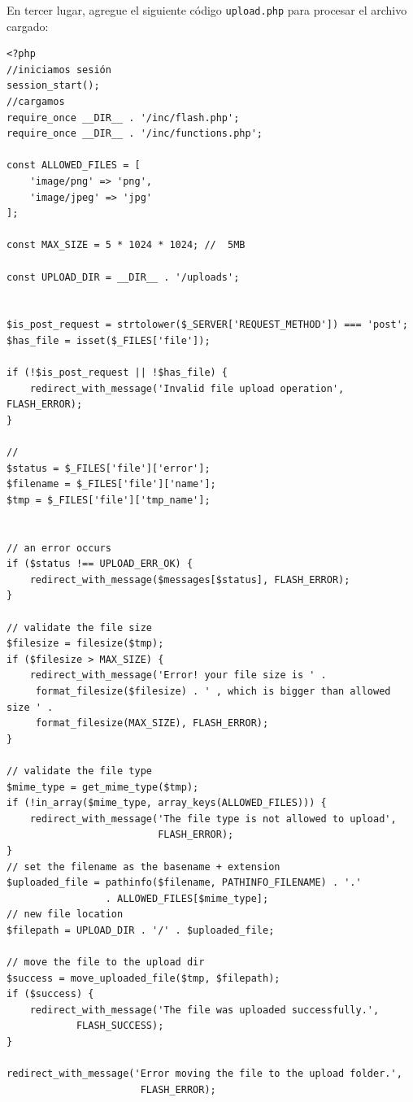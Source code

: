 \documentclass[11pt]{article}
\begin{document}
En tercer lugar, agregue el siguiente código \texttt{upload.php} para
procesar el archivo cargado:
\begin{verbatim}
<?php
//iniciamos sesión
session_start();
//cargamos
require_once __DIR__ . '/inc/flash.php';
require_once __DIR__ . '/inc/functions.php';

const ALLOWED_FILES = [
    'image/png' => 'png',
    'image/jpeg' => 'jpg'
];

const MAX_SIZE = 5 * 1024 * 1024; //  5MB

const UPLOAD_DIR = __DIR__ . '/uploads';


$is_post_request = strtolower($_SERVER['REQUEST_METHOD']) === 'post';
$has_file = isset($_FILES['file']);

if (!$is_post_request || !$has_file) {
    redirect_with_message('Invalid file upload operation', FLASH_ERROR);
}

//
$status = $_FILES['file']['error'];
$filename = $_FILES['file']['name'];
$tmp = $_FILES['file']['tmp_name'];


// an error occurs
if ($status !== UPLOAD_ERR_OK) {
    redirect_with_message($messages[$status], FLASH_ERROR);
}

// validate the file size
$filesize = filesize($tmp);
if ($filesize > MAX_SIZE) {
    redirect_with_message('Error! your file size is ' .
     format_filesize($filesize) . ' , which is bigger than allowed size ' .
     format_filesize(MAX_SIZE), FLASH_ERROR);
}

// validate the file type
$mime_type = get_mime_type($tmp);
if (!in_array($mime_type, array_keys(ALLOWED_FILES))) {
    redirect_with_message('The file type is not allowed to upload',
                          FLASH_ERROR);
}
// set the filename as the basename + extension
$uploaded_file = pathinfo($filename, PATHINFO_FILENAME) . '.'
                 . ALLOWED_FILES[$mime_type];
// new file location
$filepath = UPLOAD_DIR . '/' . $uploaded_file;

// move the file to the upload dir
$success = move_uploaded_file($tmp, $filepath);
if ($success) {
    redirect_with_message('The file was uploaded successfully.',
            FLASH_SUCCESS);
}

redirect_with_message('Error moving the file to the upload folder.',
                       FLASH_ERROR);
\end{verbatim}
\end{document}
